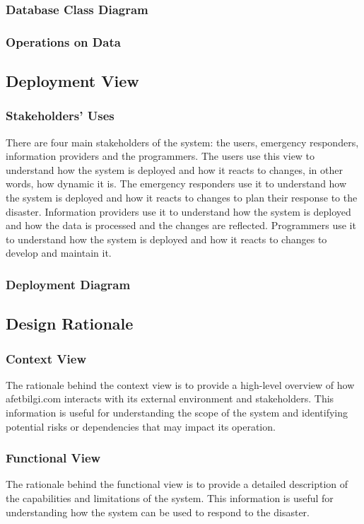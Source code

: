 \documentclass[a4paper]{article}
\begin{document}
    \subsubsection{Database Class Diagram}
    \subsubsection{Operations on Data}
    \lipsum[1-1]
    \subsection{Deployment View}
    \subsubsection{Stakeholders' Uses}
    There are four main stakeholders of the system: the users, emergency responders, information providers and the programmers.
    The users use this view to understand how the system is deployed and how it reacts to changes, in other words, how dynamic it is.
    The emergency responders use it to understand how the system is deployed and how it reacts to changes to plan their response
    to the disaster. Information providers use it to understand how the system is deployed and how the data is processed and the
    changes are reflected. Programmers use it to understand how the system is deployed and how it reacts to changes to develop
    and maintain it.
    \subsubsection{Deployment Diagram}
    \subsection{Design Rationale}
    \subsubsection{Context View}
    The rationale behind the context view is to provide a high-level overview of how afetbilgi.com interacts with its external
    environment and stakeholders. This information is useful for understanding the scope of the system and identifying potential
    risks or dependencies that may impact its operation.
    \subsubsection{Functional View}
    The rationale behind the functional view is to provide a detailed description of the capabilities and limitations of the
    system. This information is useful for understanding how the system can be used to respond to the disaster.
\end{document}
